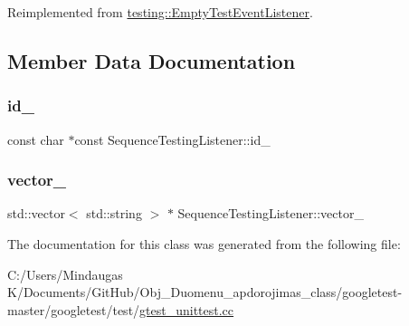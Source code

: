 Reimplemented from \mbox{\hyperlink{classtesting_1_1_empty_test_event_listener_ac3f5033fcd82080edb45f546ce9854fe}{testing\+::\+Empty\+Test\+Event\+Listener}}.



\subsection{Member Data Documentation}
\mbox{\label{class_sequence_testing_listener_aec447cbd7cc4654b1bdbd75abcbc138f}} 
\subsubsection{\texorpdfstring{id\_}{id\_}}
{\footnotesize\ttfamily const char $\ast$const Sequence\+Testing\+Listener\+::id\+\_\+\hspace{0.3cm}{\ttfamily [private]}}

\mbox{\label{class_sequence_testing_listener_ad5dfd0f0de44d9444803201f3e22fc98}} 
\subsubsection{\texorpdfstring{vector\_}{vector\_}}
{\footnotesize\ttfamily std\+::vector$<$ std\+::string $>$ $\ast$ Sequence\+Testing\+Listener\+::vector\+\_\+\hspace{0.3cm}{\ttfamily [private]}}



The documentation for this class was generated from the following file\+:\begin{DoxyCompactItemize}
\item 
C\+:/\+Users/\+Mindaugas K/\+Documents/\+Git\+Hub/\+Obj\+\_\+\+Duomenu\+\_\+apdorojimas\+\_\+class/googletest-\/master/googletest/test/\mbox{\hyperlink{googletest-master_2googletest_2test_2gtest__unittest_8cc}{gtest\+\_\+unittest.\+cc}}\end{DoxyCompactItemize}
